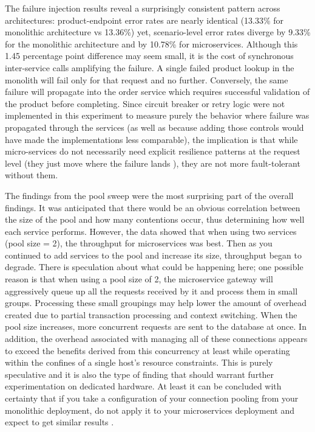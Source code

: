 \documentclass[smallextended,natbib]{svjour3}
\begin{document}
The failure injection results reveal a surprisingly consistent pattern across architectures: product-endpoint error rates are nearly identical (13.33\% for monolithic architecture vs 13.36\%) yet, scenario-level error rates diverge by 9.33\% for the monolithic architecture and by 10.78\% for microservices. Although this 1.45 percentage point difference may seem small, it is the cost of synchronous inter-service calls amplifying the failure. A single failed product lookup in the monolith will fail only for that request and no further. Conversely, the same failure will propagate into the order service which requires successful validation of the product before completing. Since circuit breaker or retry logic were not implemented in this experiment to measure purely the behavior where failure was propagated through the services (as well as because adding those controls would have made the implementations less comparable), the implication is that while micro-services do not necessarily need explicit resilience patterns at the request level (they just move where the failure lands \cite{google_sre}), they are not more fault-tolerant without them.

The findings from the pool sweep were the most surprising part of the overall findings. It was anticipated that there would be an obvious correlation between the size of the pool and how many contentions occur, thus determining how well each service performs. However, the data showed that when using two services (pool size = 2), the throughput for microservices was best. Then as you continued to add services to the pool and increase its size, throughput began to degrade. There is speculation about what could be happening here; one possible reason is that when using a pool size of 2, the microservice gateway will aggressively queue up all the requests received by it and process them in small groups. Processing these small groupings may help lower the amount of overhead created due to partial transaction processing and context switching. When the pool size increases, more concurrent requests are sent to the database at once. In addition, the overhead associated with managing all of these connections appears to exceed the benefits derived from this concurrency at least while operating within the confines of a single host's resource constraints. This is purely speculative and it is also the type of finding that should warrant further experimentation on dedicated hardware. At least it can be concluded with certainty that if you take a configuration of your connection pooling from your monolithic deployment, do not apply it to your microservices deployment and expect to get similar results \cite{hikaricp,postgres_max_connections}.
\end{document}
